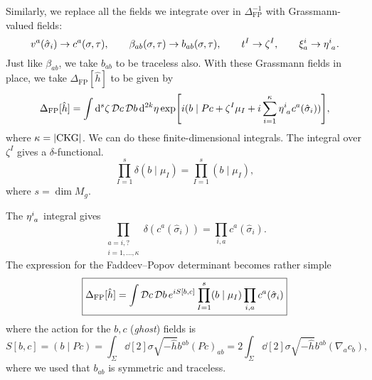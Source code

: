 Similarly, we replace all the fields we integrate over in $\Delta_{\text{FP}}^{-1}$ with Grassmann-valued fields:
\begin{equation}
  v^a(\hat{\sigma}_i) \to c^a(\sigma, \tau), \qquad 
  \beta_{ab}(\sigma, \tau) \to b_{ab}(\sigma, \tau), \qquad
  t^I \to \zeta^I, \qquad
  \xi^i_a \to \eta\indices{^{i}_{a}}.
\end{equation}
Just like $\beta_{ab}$, we take $b_{ab}$ to be traceless also.
With these Grassmann fields in place, we take $\Delta_{\text{FP}}[\hat{h}]$ to be given by
\begin{equation}
  \Delta_{\text{FP}}[\hat{h}] = \int \dd[s]{\zeta} \pdd{c} \pdd{b} \dd[2k]{\eta} \exp[i (b \mid Pc + \zeta^I \mu_I + i \sum_{i=1}^{\kappa} \eta\indices{^{i}_{a}} c^a(\hat{\sigma}_i))],
\end{equation}
where $\kappa = \abs{\text{CKG}}$.
We can do these finite-dimensional integrals.
The integral over $\zeta^I$ gives a $\delta$-functional.
\begin{equation}
  \prod_{I =1}^s \delta(b \mid \mu_I) = \prod_{I = 1}^s (b \mid \mu_I),
\end{equation}
where $s = \dim M_g$.

The $\eta\indices{^{i}_{a}}$  integral gives
\begin{equation}
  \prod_{\substack{a= i, ? \\i = 1, \dots, \kappa}} \delta(c^a(\hat{\sigma}_i))  = \prod_{i, a} c^a(\hat{\sigma}_i).
\end{equation}
The expression for the Faddeev--Popov determinant becomes rather simple
\begin{equation}
  \boxed{\Delta_{\text{FP}}[\hat{h}] = \int \mathop{\mathcal{D} c} \mathop{\mathcal{D} b} e^{i S[b, c]} \prod_{I = 1}^s (b \mid \mu_I) \prod_{i, a} c^a (\hat{\sigma}_i)}
\end{equation}
where the action for the $b, c$  (\emph{ghost}) fields is
\begin{equation}
  S[b, c] = (b \mid Pc) = \int_\Sigma \dd[2]{\sigma} \sqrt{-\hat{h}} b^{ab} (Pc)_{ab} = 2 \int_\Sigma \dd[2]{\sigma} \sqrt{-\hat{h}} b^{ab} (\nabla_a c_b),
\end{equation}
where we used that $b_{ab}$ is symmetric and traceless.
